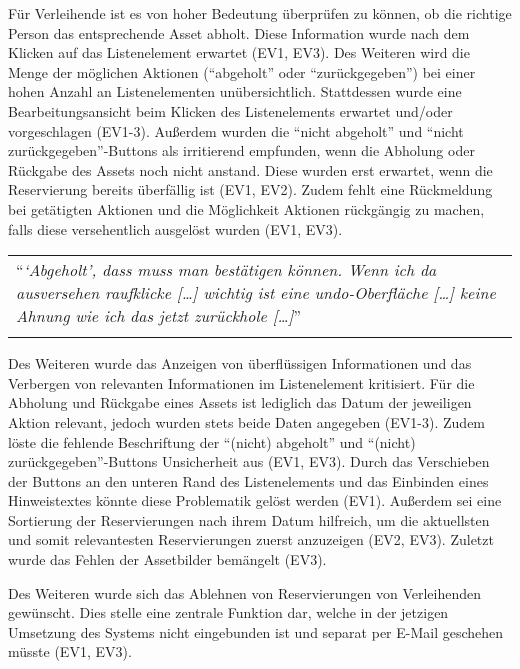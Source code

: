 Für Verleihende ist es von hoher Bedeutung überprüfen zu können, ob die richtige Person das
entsprechende Asset abholt. Diese Information wurde nach dem Klicken auf das Listenelement erwartet
(EV1, EV3). Des Weiteren wird die Menge der möglichen Aktionen (\enquote{abgeholt} oder
\enquote{zurückgegeben}) bei einer hohen Anzahl an Listenelementen unübersichtlich. Stattdessen
wurde eine Bearbeitungsansicht beim Klicken des Listenelements erwartet und/oder vorgeschlagen
(EV1-3). Außerdem wurden die \enquote{nicht abgeholt} und \enquote{nicht zurückgegeben}-Buttons als
irritierend empfunden, wenn die Abholung oder Rückgabe des Assets noch nicht anstand. Diese wurden
erst erwartet, wenn die Reservierung bereits überfällig ist (EV1, EV2). Zudem fehlt eine Rückmeldung
bei getätigten Aktionen und die Möglichkeit Aktionen rückgängig zu machen, falls diese versehentlich
ausgelöst wurden (EV1, EV3).

\begin{longtable}{p{}} \arrayrulecolor{maincolor}\hline
        \enquote{\textit{\enquote{Abgeholt}, dass muss man bestätigen können. Wenn ich
        da ausversehen raufklicke [\dots] wichtig ist eine undo-Oberfläche [\dots]
        keine Ahnung wie ich das jetzt zurückhole [\dots]}} \\
        \arrayrulecolor{maincolor}\hline
\end{longtable}

Des Weiteren wurde das Anzeigen von überflüssigen Informationen und das Verbergen von relevanten
Informationen im Listenelement kritisiert. Für die Abholung und Rückgabe eines Assets ist lediglich
das Datum der jeweiligen Aktion relevant, jedoch wurden stets beide Daten angegeben (EV1-3). Zudem
löste die fehlende Beschriftung der \enquote{(nicht) abgeholt} und \enquote{(nicht)
        zurückgegeben}-Buttons Unsicherheit aus (EV1, EV3). Durch das Verschieben der Buttons an den unteren
Rand des Listenelements und das Einbinden eines Hinweistextes könnte diese Problematik gelöst
werden (EV1). Außerdem sei eine Sortierung der Reservierungen nach ihrem Datum hilfreich, um die
aktuellsten und somit relevantesten Reservierungen zuerst anzuzeigen (EV2, EV3). Zuletzt wurde das Fehlen
der Assetbilder bemängelt (EV3).

Des Weiteren wurde sich das Ablehnen von Reservierungen von Verleihenden gewünscht. Dies stelle
eine zentrale Funktion dar, welche in der jetzigen Umsetzung des Systems nicht eingebunden ist und
separat per E-Mail geschehen müsste (EV1, EV3).

